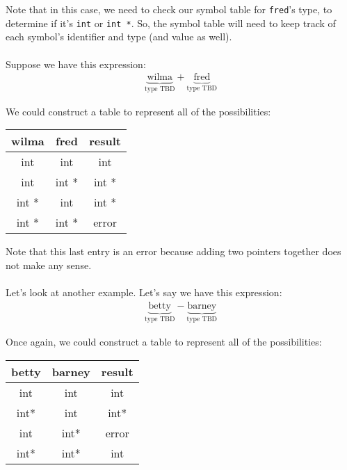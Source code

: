 \documentclass[]{article}
\theoremstyle{definition}
\begin{document}
				Note that in this case, we need to check our symbol table for \verb+fred+'s type, to determine if it's \verb+int+ or \verb+int *+. So, the symbol table will need to keep track of each symbol's identifier and type (and value as well).
				\\ \\
				Suppose we have this expression:
				\begin{align*}
					\underbrace{\text{wilma}}_{\text{type TBD}} + \underbrace{\text{fred}}_{\text{type TBD}}
				\end{align*}

				We could construct a table to represent all of the possibilities:
				\begin{center}
					\begin{tabular}{|c|c|c|}
						\hline
						\textbf{wilma} & \textbf{fred} & \textbf{result} \\ \hline
						int & int & int \\
						int & int * & int * \\
						int * & int & int * \\
					int * & int * & error \\ \hline
					\end{tabular}
				\end{center}

				Note that this last entry is an error because adding two pointers together does not make any sense.
				\\ \\
				Let's look at another example. Let's say we have this expression:
				\begin{align*}
					\underbrace{\text{betty}}_{\text{type TBD}} - \underbrace{\text{barney}}_{\text{type TBD}}
				\end{align*}

				Once again, we could construct a table to represent all of the possibilities:
				\begin{center}
					\begin{tabular}{|c|c|c|}
						\hline
						\textbf{betty} & \textbf{barney} & \textbf{result} \\ \hline
						int & int & int \\
						int* & int & int* \\
						int & int* & error \\
						int* & int* & int \\ \hline
					\end{tabular}
				\end{center}
\end{document}

